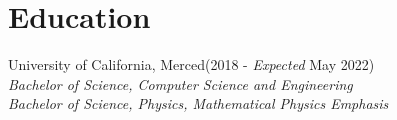\documentclass[./Resume.tex]{subfiles}
\begin{document}
\section{Education}
University of California, Merced\null\hfill(2018 - \emph{Expected} May 2022)\\
           \emph{Bachelor of Science, Computer Science and Engineering}\\
           \emph{Bachelor of Science, Physics, Mathematical Physics Emphasis}
\end{document}
